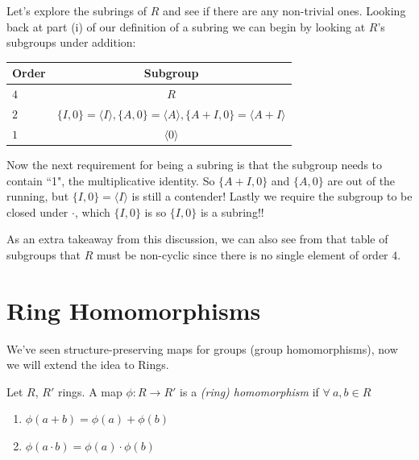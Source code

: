 \begin{example}
\noindent Let's explore the subrings of $R$ and see if there are any non-trivial ones. Looking back at part
(i) of our definition of a subring we can begin by looking at $R$'s subgroups under addition:
\begin{center}
    \begin{tabular}{|l|c|} \hline
         \textbf{Order } & \textbf{Subgroup}  \\ \hline
         $4$ & $R$ \\ \hline
         $2$ & $\{I,0\}=\langle I \rangle, \{A,0\}=\langle A \rangle, \{A+I,0\}= \langle A+I \rangle$ \\ \hline
         $1$ & $\langle 0 \rangle $ \\ \hline
\end{tabular}
\end{center}
Now the next requirement for being a subring is that the subgroup needs to contain ``1", the
multiplicative identity. So $\{A+I,0\}$ and $\{A,0\}$ are out of the running, but
$\{I,0\}=\langle I \rangle$ is still a contender! Lastly we require the subgroup to be closed under
$\cdot$, which $\{I,0\}$ is so $\{I,0\}$ is a subring!!

As an extra takeaway from this discussion, we can also see from that table of subgroups that $R$
must be non-cyclic since there is no single element of order $4$.
\end{example}

\section{Ring Homomorphisms}
We've seen structure-preserving maps for groups (group homomorphisms), now we will extend the idea
to Rings.
\begin{definition}\label{def:ring-hom}
Let $R$, $R'$ rings. A map $\phi : R \rightarrow R'$ is a \textit{(ring) homomorphism} if
$\forall \ a,b \in R$
\begin{enumerate}
    \item $\phi(a+b)=\phi(a)+\phi(b)$
    \item $\phi(a\cdot b) = \phi(a)\cdot \phi(b)$
\end{enumerate}
\end{definition}

